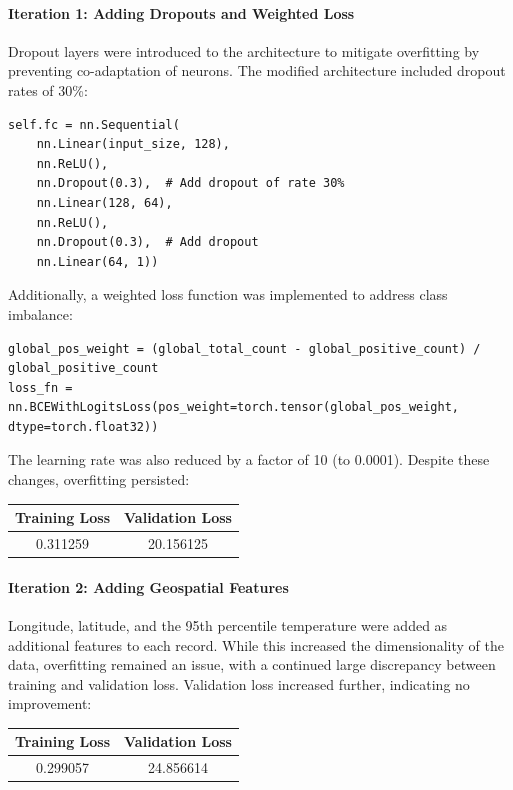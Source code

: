 \documentclass[conference,9pt]{IEEEtran}
\begin{document}
\paragraph{Iteration 1: Adding Dropouts and Weighted Loss}
Dropout layers were introduced to the architecture to mitigate overfitting by preventing co-adaptation of neurons. The modified architecture included dropout rates of 30\%:
\begin{lstlisting}
self.fc = nn.Sequential(
    nn.Linear(input_size, 128),
    nn.ReLU(),
    nn.Dropout(0.3),  # Add dropout of rate 30%
    nn.Linear(128, 64),
    nn.ReLU(),
    nn.Dropout(0.3),  # Add dropout
    nn.Linear(64, 1))
\end{lstlisting}
Additionally, a weighted loss function was implemented to address class imbalance:
\begin{lstlisting}
global_pos_weight = (global_total_count - global_positive_count) / global_positive_count
loss_fn = nn.BCEWithLogitsLoss(pos_weight=torch.tensor(global_pos_weight, dtype=torch.float32))
\end{lstlisting}
The learning rate was also reduced by a factor of 10 (to 0.0001). Despite these changes, overfitting persisted:
\begin{center}
    \begin{tabular}{c|c}
        Training Loss & Validation Loss \\ 
        \hline 
        0.311259 & 20.156125 \\
    \end{tabular}
\end{center}
\paragraph{Iteration 2: Adding Geospatial Features}
Longitude, latitude, and the 95th percentile temperature were added as additional features to each record. While this increased the dimensionality of the data, overfitting remained an issue, with a continued large discrepancy between training and validation loss. Validation loss increased further, indicating no improvement:
\begin{center}
    \begin{tabular}{c|c}
        Training Loss & Validation Loss \\ 
        \hline 
        0.299057 & 24.856614 \\
    \end{tabular}
\end{center}
\end{document}
